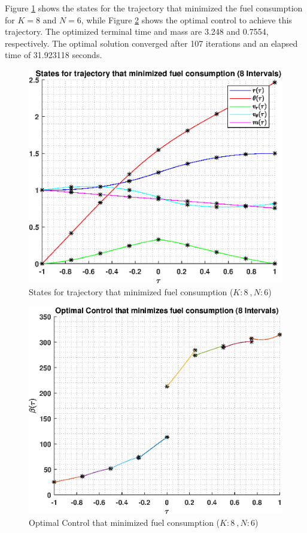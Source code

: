 \documentclass[]{article}
\begin{document}
\vspace{2mm}\newline 
Figure \ref{fig:directStatesK8Poly6} shows the states for the trajectory that minimized the fuel consumption for \(K = 8\) and  \(N = 6\), while Figure \ref{fig:directControlK8Poly6} shows the optimal control to achieve this trajectory. The optimized terminal time and mass are 3.248 and 0.7554, respectively. The optimal solution converged after 107 iterations and an elapsed time of 31.923118 seconds. 
\begin{figure}
	\centering
	\includegraphics[scale=0.75]{directStatesK8Poly6.eps}
	\caption{States for trajectory that minimized fuel consumption (\(K:8\ , N:6\))}
	\label{fig:directStatesK8Poly6}
\end{figure}
\begin{figure}
	\centering
	\includegraphics[scale=0.75]{directControlK8Poly6.eps}
	\caption{Optimal Control that minimized fuel consumption (\(K:8\ , N:6\))}
	\label{fig:directControlK8Poly6}
\end{figure}
\end{document}
